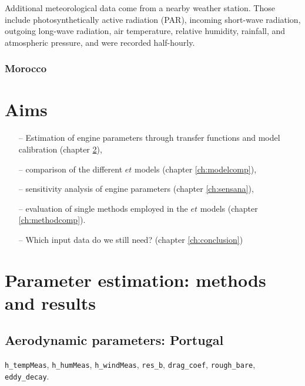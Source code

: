 \documentclass{scrreprt}
\begin{document}
Additional meteorological data come from a nearby weather station.
Those include photosynthetically active radiation (PAR), incoming short-wave radiation, outgoing long-wave radiation, air temperature, relative humidity, rainfall, and atmospheric pressure, and were recorded half-hourly.

\subsection{Morocco} \label{ssec:intro_areas_morocco}



\chapter{Aims} \label{ch:aims}

\begin{itemize}
  \item[--] Estimation of engine parameters through transfer functions and model calibration (chapter \ref{ch:parest}),
  \item[--] comparison of the different $et$ models (chapter \ref{ch:modelcomp}),
  \item[--] sensitivity analysis of engine parameters (chapter \ref{ch:sensana}),
  \item[--] evaluation of single methods employed in the $et$ models (chapter \ref{ch:methodcomp}).
  \item[--] Which input data do we still need? (chapter \ref{ch:conclusion})
\end{itemize}


\chapter{Parameter estimation: methods and results} \label{ch:parest}

\section{Aerodynamic parameters: Portugal} \label{sec:parest_met}

\verb!h_tempMeas!, \verb!h_humMeas!, \verb!h_windMeas!, \verb!res_b!, \verb!drag_coef!, \verb!rough_bare!, \verb!eddy_decay!.
\end{document}
